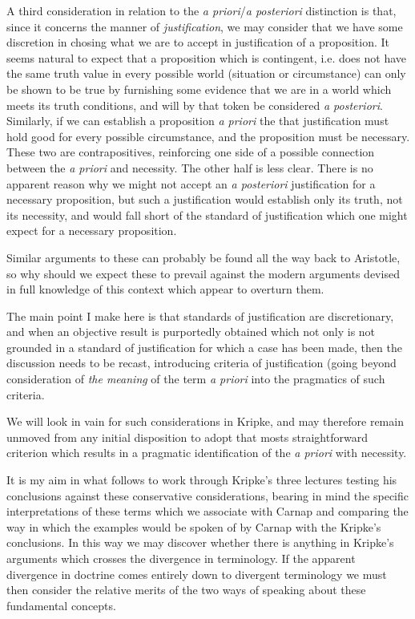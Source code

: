 A third consideration in relation to the \emph{a priori}/\emph{a posteriori}
distinction is that, since it concerns the manner of \emph{justification},
we may consider that we have some discretion in chosing what we are to accept
in justification of a proposition.
It seems natural to expect that a proposition which is contingent,
i.e. does not have the same truth value in every possible world (situation or circumstance)
can only be shown to be true by furnishing some evidence that we are in a world
which meets its truth conditions, and will by that token be considered \emph{a posteriori}.
Similarly, if we can establish a proposition \emph{a priori} the that justification
must hold good for every possible circumstance, and the proposition must be necessary.
These two are contrapositives, reinforcing one side of a possible connection between
the \emph{a priori} and necessity.
The other half is less clear.
There is no apparent reason why we might not accept an \emph{a posteriori} justification
for a necessary proposition, but such a justification would establish only its truth,
not its necessity, and would fall short of the standard of justification which one
might expect for a necessary proposition.

Similar arguments to these can probably be found all the way back to Aristotle,
so why should we expect these to prevail against the modern arguments devised in
full knowledge of this context which appear to overturn them.

The main point I make here is that standards of justification are discretionary,
and when an objective result is purportedly obtained which not only is not grounded
in a standard of justification for which a case has been made, then the discussion
needs to be recast, introducing criteria of justification (going beyond consideration
of \emph{the meaning} of the term \emph{a priori} into the pragmatics of such criteria.

We will look in vain for such considerations in Kripke, and may therefore remain
unmoved from any initial disposition to adopt that mosts straightforward criterion
which results in a pragmatic identification of the \emph{a priori} with necessity.

It is my aim in what follows to work through Kripke's three lectures testing his
conclusions against these conservative considerations, bearing in mind the specific
interpretations of these terms which we associate with Carnap and comparing the
way in which the examples would be spoken of by Carnap with the Kripke's conclusions.
In this way we may discover whether there is anything in Kripke's arguments which
crosses the divergence in terminology.
If the apparent divergence in doctrine comes entirely down to divergent terminology
we must then consider the relative merits of the two ways of speaking about these
fundamental concepts.

